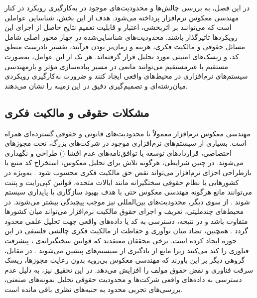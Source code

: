 

در این فصل، به بررسی چالش‌ها و محدودیت‌های موجود در به‌کارگیری رویکرد  در کنار مهندسی معکوس نرم‌افزار پرداخته می‌شود. هدف از این بخش، شناسایی عواملی است که می‌توانند بر اثربخشی، اعتبار و قابلیت تعمیم نتایج حاصل از اجرای این رویکردها تاثیرگذار باشند. محدودیت‌های شناسایی‌شده در چهار محور اصلی شامل مسائل حقوقی و مالکیت فکری، هزینه و زمان‌بر بودن فرآیند، تفسیر نادرست منطق کد، و ریسک‌های امنیتی مورد تحلیل قرار گرفته‌اند. هر یک از این عوامل، به‌صورت مستقیم یا غیرمستقیم می‌توانند مانعی در مسیر پیاده‌سازی مؤثر  و بازمهندسی سیستم‌های نرم‌افزاری در محیط‌های واقعی ایجاد کنند و ضرورت به‌کارگیری رویکردی میان‌رشته‌ای و تصمیم‌گیری دقیق در این زمینه را نشان می‌دهند.

\subsection*{مشکلات حقوقی و مالکیت فکری}
مهندسی معکوس نرم‌افزار معمولاً با محدودیت‌های قانونی و حقوقی گسترده‌ای همراه است. بسیاری از سیستم‌های نرم‌افزاری موجود در شرکت‌های بزرگ، تحت مجوزهای اختصاصی، قراردادهای توسعه یا توافق‌نامه‌های عدم افشا () طراحی و نگهداری می‌شوند. در چنین شرایطی، هرگونه تلاش برای تحلیل معکوس، استخراج کد منبع یا بازطراحی اجزای نرم‌افزار می‌تواند نقض حق مالکیت فکری محسوب شود \cite{nrc1991}. به‌ویژه در کشورهایی با نظام حقوقی سختگیرانه مانند ایالات متحده، قوانین کپی‌رایت و پتنت می‌توانند مانع هرگونه مهندسی معکوس حتی با هدف بهبود سازگاری یا پایداری سیستم شوند \cite{ttc2024}.
از سوی دیگر، محدودیت‌های بین‌المللی نیز موجب پیچیدگی بیشتر می‌شوند. در محیط‌های چندملیتی، تعریف و اجرای حقوق مالکیت نرم‌افزار می‌تواند میان کشورها متفاوت باشد و در نتیجه، دسترسی به کد یا داده‌های واقعی جهت تحلیل علمی محدود گردد \cite{quarkslab2023}. 
همچنین، تضاد میان نوآوری و حفاظت از مالکیت فکری چالشی فلسفی در این حوزه ایجاد کرده است. برخی محققان معتقدند که قوانین سختگیرانه‌ی ، پیشرفت فناوری را کند می‌کنند زیرا مانع از یادگیری از سیستم‌های پیشین می‌شوند \cite{ipwatchdog2021}. در مقابل، گروهی دیگر بر این باورند که مهندسی معکوس بی‌رویه بدون رعایت مجوزها، ریسک سرقت فناوری و نقض حقوق مولف را افزایش می‌دهد. در این تحقیق نیز، به دلیل عدم دسترسی به داده‌های واقعی شرکت‌ها و محدودیت حقوقی تحلیل نمونه‌های صنعتی، بررسی‌های تجربی محدود به جنبه‌های نظری باقی مانده است.

